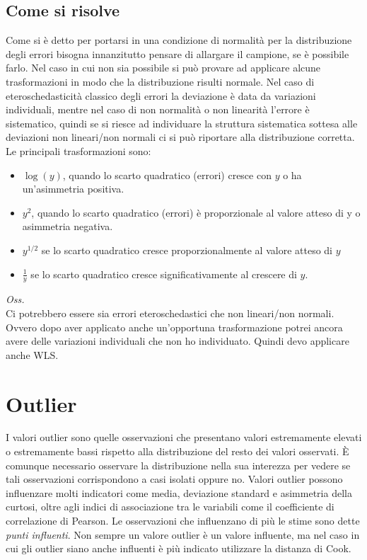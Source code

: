 \subsection{Come si risolve}
Come si è detto per portarsi in una condizione di normalità per la distribuzione degli errori bisogna innanzitutto pensare di allargare il campione, se è possibile farlo. Nel caso in cui non sia possibile si può provare ad applicare alcune trasformazioni in modo che la distribuzione risulti normale. Nel caso di eteroschedasticità classico degli errori la deviazione è data da variazioni individuali, mentre nel caso di non normalità o non linearità l'errore è sistematico, quindi se si riesce ad individuare la struttura sistematica sottesa alle deviazioni non lineari/non normali ci si può riportare alla distribuzione corretta. Le principali trasformazioni sono:
\begin{itemize}
	\item $\log(y)$, quando lo scarto quadratico (errori) cresce con $y$ o ha un'asimmetria positiva.
	\item $y^2$, quando lo scarto quadratico (errori) è proporzionale al valore atteso di y o asimmetria negativa.
	\item $y^{1/2}$ se lo scarto quadratico cresce proporzionalmente al valore atteso di $y$
	\item $\frac{1}{y}$ se lo scarto quadratico cresce significativamente al crescere di $y$.
\end{itemize}

\textit{Oss.}\\
Ci potrebbero essere sia errori eteroschedastici che non lineari/non normali. Ovvero dopo aver applicato anche un'opportuna trasformazione potrei ancora avere delle variazioni individuali che non ho individuato. Quindi devo applicare anche WLS.

\section{Outlier}
I valori outlier sono quelle osservazioni che presentano valori estremamente elevati o estremamente bassi rispetto alla distribuzione del resto dei valori osservati. È comunque necessario osservare la distribuzione nella sua interezza per vedere se tali osservazioni corrispondono a casi isolati oppure no. Valori outlier possono influenzare molti indicatori come media, deviazione standard e asimmetria della curtosi, oltre agli indici di associazione tra le variabili come il coefficiente di correlazione di Pearson. Le osservazioni che influenzano di più le stime sono dette \textit{punti influenti}. Non sempre un valore outlier è un valore influente, ma nel caso in cui gli outlier siano anche influenti è più indicato utilizzare la distanza di Cook.

